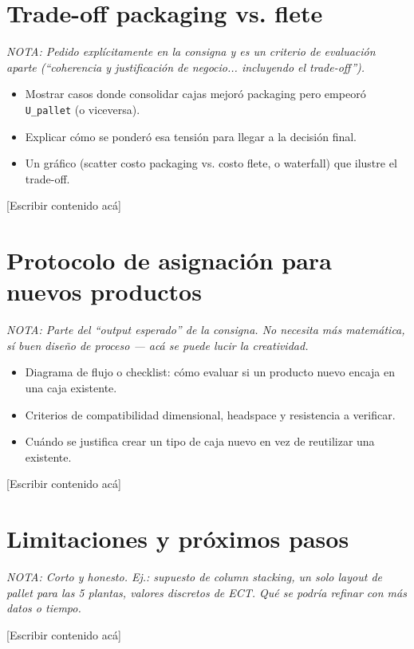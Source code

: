 \documentclass[11pt]{article}
\newcommand{\nota}[1]{{\itshape\color{notegray}\small NOTA: #1}\par\vspace{2pt}}
\newenvironment{notalist}{\begin{itemize}[itemsep=1pt,topsep=2pt,leftmargin=1.4em]\itshape\color{notegray}\small}{\end{itemize}\vspace{2pt}}
\newcommand{\placeholder}{\color{placeholdergray}[Escribir contenido acá]\color{black}\par\vspace{6pt}}
\begin{document}
\section{Trade-off packaging vs. flete}
\nota{Pedido explícitamente en la consigna y es un criterio de evaluación aparte (``coherencia y justificación de negocio... incluyendo el trade-off'').}
\begin{notalist}
\item Mostrar casos donde consolidar cajas mejoró packaging pero empeoró \texttt{U\_pallet} (o viceversa).
\item Explicar cómo se ponderó esa tensión para llegar a la decisión final.
\item Un gráfico (scatter costo packaging vs. costo flete, o waterfall) que ilustre el trade-off.
\end{notalist}
\placeholder

\section{Protocolo de asignación para nuevos productos}
\nota{Parte del ``output esperado'' de la consigna. No necesita más matemática, sí buen diseño de proceso --- acá se puede lucir la creatividad.}
\begin{notalist}
\item Diagrama de flujo o checklist: cómo evaluar si un producto nuevo encaja en una caja existente.
\item Criterios de compatibilidad dimensional, headspace y resistencia a verificar.
\item Cuándo se justifica crear un tipo de caja nuevo en vez de reutilizar una existente.
\end{notalist}
\placeholder

\section{Limitaciones y próximos pasos}
\nota{Corto y honesto. Ej.: supuesto de column stacking, un solo layout de pallet para las 5 plantas, valores discretos de ECT. Qué se podría refinar con más datos o tiempo.}
\placeholder

\end{document}
